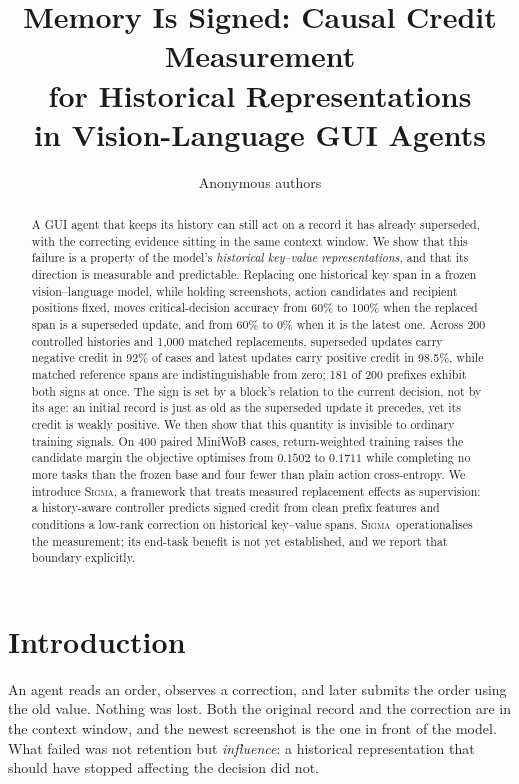\documentclass{article}
\title{Memory Is Signed: Causal Credit Measurement\\for Historical Representations\\in Vision-Language GUI Agents}
\author{Anonymous authors}
\newcommand{\method}{\textsc{Sigma}}
\begin{document}
\maketitle

\begin{abstract}
A GUI agent that keeps its history can still act on a record it has already
superseded, with the correcting evidence sitting in the same context window.
We show that this failure is a property of the model's \emph{historical
key--value representations}, and that its direction is measurable and
predictable. Replacing one historical key span in a frozen vision--language
model, while holding screenshots, action candidates and recipient positions
fixed, moves critical-decision accuracy from 60\% to 100\% when the replaced
span is a superseded update, and from 60\% to 0\% when it is the latest one.
Across 200 controlled histories and 1{,}000 matched replacements, superseded
updates carry negative credit in 92\% of cases and latest updates carry positive
credit in 98.5\%, while matched reference spans are indistinguishable from zero;
181 of 200 prefixes exhibit both signs at once. The sign is set by a block's
relation to the current decision, not by its age: an initial record is just as
old as the superseded update it precedes, yet its credit is weakly positive. We
then show that this quantity is invisible to ordinary training signals. On 400
paired MiniWoB cases, return-weighted training raises the candidate margin the
objective optimises from $0.1502$ to $0.1711$ while completing no more tasks
than the frozen base and four fewer than plain action cross-entropy. We
introduce \method, a framework that treats measured replacement effects as
supervision: a history-aware controller predicts signed credit from clean prefix
features and conditions a low-rank correction on historical key--value spans.
\method\ operationalises the measurement; its end-task benefit is not yet
established, and we report that boundary explicitly.
\end{abstract}

\section{Introduction}
\label{sec:intro}

An agent reads an order, observes a correction, and later submits the order
using the old value. Nothing was lost. Both the original record and the
correction are in the context window, and the newest screenshot is the one in
front of the model. What failed was not retention but \emph{influence}: a
historical representation that should have stopped affecting the decision did
not.
\end{document}
